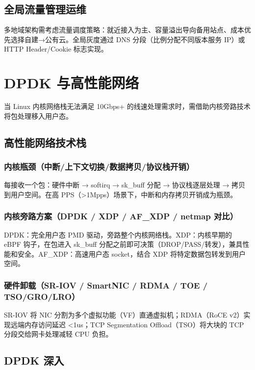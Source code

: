 \documentclass[12pt,UTF8]{ctexbook}
\begin{document}
  \section{全局流量管理运维}

多地域架构需考虑流量调度策略：就近接入为主、容量溢出导向备用站点、成本优先选择自建→公有云。全局灰度通过 DNS 分段（比例分配不同版本服务 IP）或 HTTP Header/Cookie 标志实现。


\chapter{DPDK 与高性能网络}
\label{chap:dpdk-high-perf-net}

当 Linux 内核网络栈无法满足 10Gbps+ 的线速处理需求时，需借助内核旁路技术将包处理移入用户态。

  \section{高性能网络技术栈}
    \subsection{内核瓶颈（中断/上下文切换/数据拷贝/协议栈开销）}

每接收一个包：硬件中断 → softirq → sk\_buff 分配 → 协议栈逐层处理 → 拷贝到用户空间。在高 PPS（>1Mpps）场景下，中断和内存拷贝开销成为瓶颈。

    \subsection{内核旁路方案（DPDK / XDP / AF\_XDP / netmap 对比）}

DPDK：完全用户态 PMD 驱动，旁路整个内核网络栈。XDP：内核早期的 eBPF 钩子，在包进入 sk\_buff 分配之前即可决策（DROP/PASS/转发），兼具性能和安全。AF\_XDP：高速用户态 socket，结合 XDP 将特定数据包转发到用户空间。

    \subsection{硬件卸载（SR-IOV / SmartNIC / RDMA / TOE / TSO/GRO/LRO）}

SR-IOV 将 NIC 分割为多个虚拟功能（VF）直通虚拟机；RDMA（RoCE v2）实现远端内存访问延迟 <1us；TCP Segmentation Offload（TSO）将大块的 TCP 分段交给网卡处理减轻 CPU 负担。

  \section{DPDK 深入}
\end{document}
